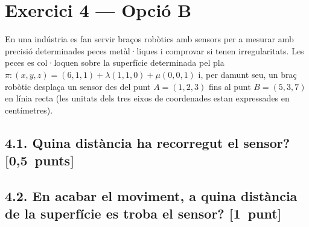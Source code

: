 \documentclass[11pt,a4paper]{article}
\begin{document}
\section*{\textcolor{blauPista}{Exercici 4 --- Opció B}}

\noindent En una indústria es fan servir braços robòtics amb sensors per a mesurar amb precisió determinades peces metàl·liques i comprovar si tenen irregularitats. Les peces es col·loquen sobre la superfície determinada pel pla $\pi: (x, y, z) = (6, 1, 1) + \lambda(1, 1, 0) + \mu(0, 0, 1)$ i, per damunt seu, un braç robòtic desplaça un sensor des del punt $A = (1, 2, 3)$ fins al punt $B = (5, 3, 7)$ en línia recta (les unitats dels tres eixos de coordenades estan expressades en centímetres).

\subsection*{4.1. \normalfont Quina distància ha recorregut el sensor? \hspace*{\fill}\textnormal{[0,5~punts]}}


\subsection*{4.2. \normalfont En acabar el moviment, a quina distància de la superfície es troba el sensor? \hspace*{\fill}\textnormal{[1~punt]}}

\end{document}
